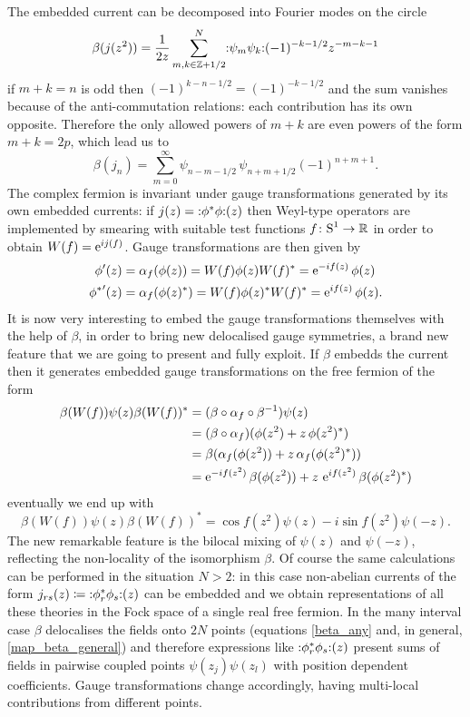 \bigskip 
The embedded current can be decomposed into Fourier modes
on the circle
\[
\beta(j(z^2))=\frac{1}{2z}\sum_{m,k\in\Z+1/2}^N
\wick{\psi_m\psi_k}(-1)^{-k-1/2}z^{-m-k-1}
\]
if $m+k=n$ is odd then $(-1)^{k-n-1/2}=
(-1)^{-k-1/2}$ and the sum vanishes because of 
the anti-commutation relations: each contribution
has its own opposite. Therefore the only allowed
powers of $m+k$ are even powers of the form $m+k=2p$, 
which lead us to 
\[
\beta(j_n)=\sum^{\infty}_{m=0}\psi_{n-m-1/2}\,
\psi_{n+m+1/2}(-1)^{n+m+1}.
\]
The complex fermion is invariant under gauge 
transformations generated by its own embedded 
currents: if $j(z)=\wick{\phi^*\phi}(z)$ then
Weyl-type operators are implemented by
smearing with suitable test functions $f\colon\textrm{S}^1\to\mathbb{R}$
in order to obtain $W(f)=\operatorname{e}^{ij(f)}$. Gauge
transformations are then given by
\begin{align*}
\phi'(z)&=\alpha_f(\phi(z))=W(f)\phi(z)W(f)^*
=\operatorname{e}^{-if(z)}\phi(z)\\
{\phi^*}'(z)&=\alpha_f(\phi(z)^*)=W(f)\phi(z)^*W(f)^*
=\operatorname{e}^{if(z)}\phi(z).
\end{align*}
It is now very interesting to embed the gauge 
transformations themselves with the help of $\beta$,
in order to bring new delocalised gauge symmetries,
a brand new feature that we are going to present and 
fully exploit. If $\beta$ embedds the current then it
generates embedded gauge transformations on the free
fermion of the form
\begin{align*}
\beta(W(f))\psi(z)\beta(W(f))^*&=(\beta\circ\alpha_f\circ 
\beta^{-1})\psi(z)\\
&=(\beta\circ\alpha_f)(\phi(z^2)+z\,\phi(z^2)^*)\\
&=\beta(\alpha_f(\phi(z^2)) + z\,\alpha_f(\phi(z^2)^*))\\
&=\operatorname{e}^{-if(z^2)}\beta(\phi(z^2))+z\,\operatorname{e}^{if(z^2)}
\beta(\phi(z^2)^*)
\end{align*}
eventually we end up with
\begin{equation}
\label{emb_gauge}
\beta(W(f))\psi(z)\beta(W(f))^*=
\cos{f(z^2)}\psi(z)-i\sin{f(z^2)}\psi(-z).
\end{equation}
The new remarkable feature is the bilocal mixing
of $\psi(z)$ and $\psi(-z)$, reflecting the 
non-locality of the isomorphism $\beta$.
Of course the same calculations can be performed 
in the situation $N>2$: in this case non-abelian 
currents of the form $j_{rs}(z)\coloneqq
\wick{\phi_r^*\phi_s}(z)$ can be embedded and we
obtain representations of all these theories in 
the Fock space of a single real free fermion. In the 
many interval case $\beta$ delocalises the fields
onto $2N$ points (equations \eqref{beta_any} and,
in general, \eqref{map_beta_general}) and therefore 
expressions like $\wick{\phi_r^*\phi_s}(z)$ present 
sums of fields in pairwise coupled points
$\psi(z_j)\psi(z_l)$ with position dependent 
coefficients. Gauge transformations change 
accordingly, having multi-local contributions 
from different points. 

